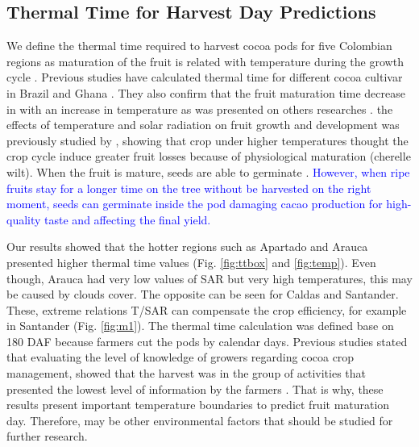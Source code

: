 \documentclass[gene,journal,article,submit,moreauthors,pdftex]{Definitions/mdpi}
\begin{document}
\subsection{Thermal Time for Harvest Day Predictions}
We define the thermal time required to harvest cocoa pods for five Colombian regions as maturation of the fruit is related with temperature during the growth cycle \citep{lopez2018}. Previous studies have calculated thermal time for  different cocoa cultivar in Brazil and Ghana \cite{Daymond2008}. They also confirm that the fruit maturation time decrease in with an increase in temperature as was presented on others researches \citep{Alvim1974, End1991, Daymond2008}. the effects of temperature and solar radiation on fruit growth and development was previously studied by \cite{Daymond2008}, showing that crop under higher temperatures thought the crop cycle induce greater fruit losses because of physiological maturation (cherelle wilt). When the fruit is mature, seeds are able to germinate  \citep{lopez2018}. \textcolor{blue}{However, when ripe fruits stay for a longer time on the tree without be harvested  on the right moment, seeds can germinate inside the pod damaging  cacao production for high-quality taste and affecting the final yield. }

Our results showed that the hotter regions such as Apartado and Arauca presented higher thermal time values (Fig. \ref{fig:ttbox} and \ref{fig:temp}). Even though, Arauca had very low values of SAR but very high temperatures, this may be caused by clouds cover. The opposite can be seen for Caldas and Santander. These, extreme relations T/SAR can compensate the crop efficiency, for example in Santander (Fig. \ref{fig:m1}).  The thermal time calculation was defined base on  180 DAF because farmers cut the pods by calendar days. Previous studies stated that evaluating the level of knowledge of growers regarding cocoa crop management, showed that the harvest was in the group of activities that presented the lowest level of information by the farmers \citep{Gutierrez2020}. That is why, these results present important temperature boundaries to predict fruit maturation day. Therefore, may be other environmental factors that should be studied for further research. 
\end{document}
